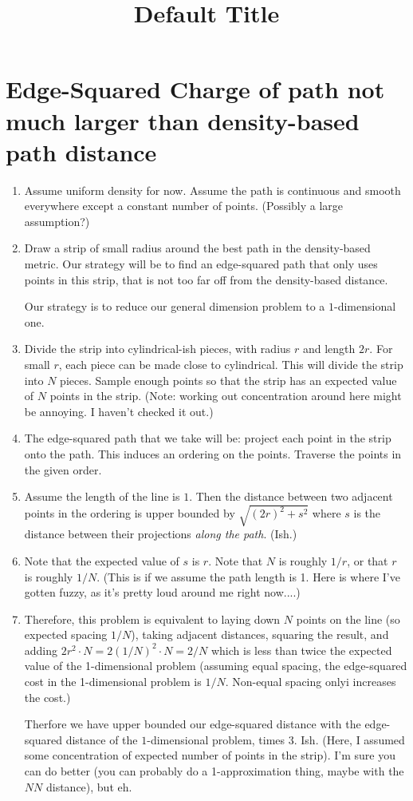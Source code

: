 \title{Default Title}


\section{Edge-Squared Charge of path not much larger than density-based path distance}
\begin{enumerate}
\item Assume uniform density for now. Assume the path is continuous and smooth everywhere except a constant number of points. (Possibly a large assumption?)
\item Draw a strip of small radius around the best path in the density-based metric. Our strategy will be to find an edge-squared path that only uses points in this strip, that is not too far off from the density-based distance.

\begin{remark}
Our strategy is to reduce our general dimension problem to a $1$-dimensional one.
\end{remark}

\item Divide the strip into cylindrical-ish pieces, with radius $r$ and length $2r$. For small $r$, each piece can be made close to cylindrical. This will divide the strip into $N$ pieces. Sample enough points so that the strip has an expected value of $N$ points in the strip. (Note: working out concentration around here might be annoying. I haven't checked it out.)

\item The edge-squared path that we take will be: project each point in the strip onto the path. This induces an ordering on the points. Traverse the points in the given order.
\item Assume the length of the line is $1$. Then the distance between two adjacent points in the ordering is upper bounded by $\sqrt{(2r)^2 + s^2}$ where $s$ is the distance between their projections \textit{along the path}. (Ish.)

\item Note that the expected value of $s$ is $r$.  Note that $N$ is roughly $1/r$, or that $r$ is roughly $1/N$. (This is if we assume the path length is 1. Here is where I've gotten fuzzy, as it's pretty loud around me right now....)

\item Therefore, this problem is equivalent to laying down $N$ points on the line (so expected spacing $1/N$), taking adjacent distances, squaring the result, and adding $2r^2 \cdot N = 2(1/N)^2 \cdot N = 2/N$ which is less than twice the expected value of the 1-dimensional problem (assuming equal spacing, the edge-squared cost in the 1-dimensional problem is $1/N$. Non-equal spacing onlyi increases the cost.)

Therfore we have upper bounded our edge-squared distance with the edge-squared distance of the $1$-dimensional problem, times $3$. Ish. (Here, I assumed some concentration of expected number of points in the strip). I'm sure you can do better (you can probably do a 1-approximation thing, maybe with the $NN$ distance), but eh.


\end{enumerate}




